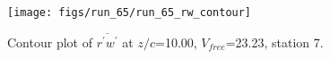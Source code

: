 \begin{figure}[H]
\centering
\texttt{[image: figs/run\_65/run\_65\_rw\_contour]}
\caption{Contour plot of $\overline{r^\prime w^\prime}$ at $z/c$=10.00, $V_{free}$=23.23, station 7.}
\end{figure}


